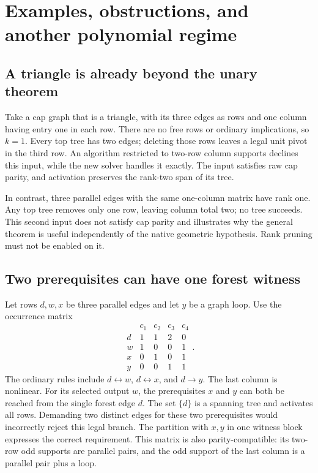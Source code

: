 \section{Examples, obstructions, and another polynomial regime}
\label{sec:examples}

\subsection{A triangle is already beyond the unary theorem}

Take a cap graph that is a triangle, with its three edges as rows and one
column having entry one in each row. There are no free rows or ordinary
implications, so $k=1$. Every top tree has two edges; deleting those rows
leaves a legal unit pivot in the third row. An algorithm restricted to
two-row column supports declines this input, while the new solver handles
it exactly. The input satisfies raw cap parity, and activation preserves
the rank-two span of its tree.

In contrast, three parallel edges with the same one-column matrix have
rank one. Any top tree removes only one row, leaving column total two;
no tree succeeds. This second input does not satisfy cap parity and
illustrates why the general theorem is useful independently of the native
geometric hypothesis. Rank pruning must not be enabled on it.

\subsection{Two prerequisites can have one forest witness}

Let rows $d,w,x$ be three parallel edges and let $y$ be a graph loop. Use
the occurrence matrix
\[
\begin{array}{c|rrrr}
       &c_1&c_2&c_3&c_4\\\hline
 d&1&1&2&0\\
 w&1&0&0&1\\
 x&0&1&0&1\\
 y&0&0&1&1
\end{array}.
\]
The ordinary rules include $d\leftrightarrow w$, $d\leftrightarrow x$,
and $d\to y$. The last column is nonlinear. For its selected output $w$,
the prerequisites $x$ and $y$ can both be reached from the single forest
edge $d$. The set $\{d\}$ is a spanning tree and activates all rows.
Demanding two distinct edges for these two prerequisites would incorrectly
reject this legal branch. The partition with $x,y$ in one witness block
expresses the correct requirement. This matrix is also parity-compatible:
its two-row odd supports are parallel pairs, and the odd support of the
last column is a parallel pair plus a loop.


